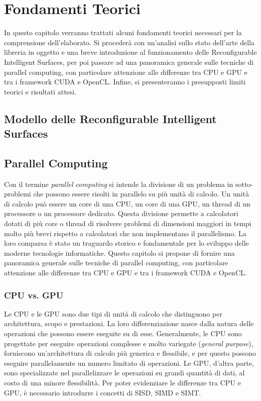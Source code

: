 \chapter{Fondamenti Teorici}
\label{ch:fondamenti}

In questo capitolo verranno trattati alcuni fondamenti teorici necessari per la
comprensione dell'elaborato. Si procederà con un'analisi sullo stato dell'arte della
libreria in oggetto e una breve introduzione al funzionamento delle Reconfigurable
Intelligent Surfaces, per poi passare ad una panoramica generale sulle tecniche
di parallel computing, con particolare attenzione alle differenze tra CPU e GPU e
tra i framework CUDA e OpenCL. Infine, si presenteranno i presupposti limiti teorici
e risultati attesi.

\section{Modello delle Reconfigurable Intelligent Surfaces}
\label{sec:statodellarte}

\lipsum[1]

\section{Parallel Computing}
\label{sec:parallelcomputing}

Con il termine \textit{parallel computing} si intende la divisione di un
problema in sotto-problemi che possono essere risolti in parallelo su più unità
di calcolo. Un unità di calcolo può essere un core di una CPU, un core di una
GPU, un thread di un processore o un processore dedicato. Questa divisione
permette a calcolatori dotati di più core o thread di risolvere problemi di
dimensioni maggiori in tempi molto più brevi rispetto a calcolatori che non
implementano il parallelismo. La loro comparsa è stato un traguardo storico e fondamentale
per lo sviluppo delle moderne tecnologie informatiche. Questo capitolo si
propone di fornire una panoramica generale sulle tecniche di parallel computing,
con particolare attenzione alle differenze tra CPU e GPU e tra i framework CUDA e
OpenCL.

\subsection{CPU vs. GPU}
\label{subsec:cpuvsgpu}

Le CPU e le GPU sono due tipi di unità di calcolo che distinguono per
architettura, scopo e prestazioni. La loro differenziazione nasce dalla natura
delle operazioni che possono essere eseguite su di esse. Generalmente, le CPU
sono progettate per eseguire operazioni complesse e molto variegate (\textit{general
purpose}), forniscono un'architettura di calcolo più generica e flessibile, e per
questo possono eseguire parallelamente un numero limitato di operazioni. Le GPU,
d'altra parte, sono specializzate nel parallelizzare le operazioni su grandi quantità
di dati, al costo di una minore flessibilità. Per poter evidenziare le differenze
tra CPU e GPU, è necessario introdurre i concetti di SISD, SIMD e SIMT.

